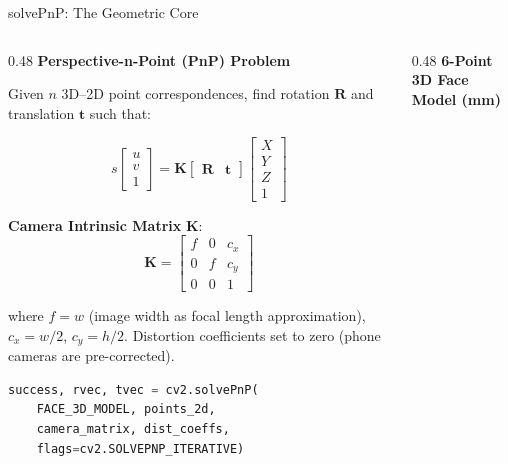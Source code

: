 \documentclass[aspectratio=169,10pt]{beamer}
\begin{document}
\begin{frame}{solvePnP: The Geometric Core}
\begin{columns}[T]
\begin{column}{0.48\textwidth}
\textbf{Perspective-n-Point (PnP) Problem}

\vspace{4pt}
\footnotesize
Given $n$ 3D--2D point correspondences, find rotation $\mathbf{R}$ and translation $\mathbf{t}$ such that:

\begin{equation*}
s \begin{bmatrix} u \\ v \\ 1 \end{bmatrix} = \mathbf{K} \begin{bmatrix} \mathbf{R} & \mathbf{t} \end{bmatrix} \begin{bmatrix} X \\ Y \\ Z \\ 1 \end{bmatrix}
\end{equation*}

\textbf{Camera Intrinsic Matrix} $\mathbf{K}$:
\begin{equation*}
\mathbf{K} = \begin{bmatrix} f & 0 & c_x \\ 0 & f & c_y \\ 0 & 0 & 1 \end{bmatrix}
\end{equation*}

\vspace{2pt}
\scriptsize
where $f = w$ (image width as focal length approximation), $c_x = w/2$, $c_y = h/2$. Distortion coefficients set to zero (phone cameras are pre-corrected).

\vspace{6pt}
\begin{lstlisting}[language=Python]
success, rvec, tvec = cv2.solvePnP(
    FACE_3D_MODEL, points_2d,
    camera_matrix, dist_coeffs,
    flags=cv2.SOLVEPNP_ITERATIVE)
\end{lstlisting}
\end{column}

\begin{column}{0.48\textwidth}
\textbf{6-Point 3D Face Model (mm)}


\end{column}
\end{columns}
\end{frame}
\end{document}
